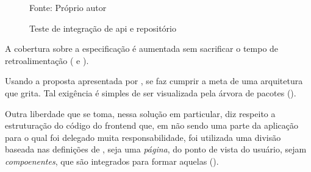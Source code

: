   \begin{figure}[h]
    \centering
    \caption{Teste de integração de api e repositório}
    \small{Fonte: Próprio autor}
    \label{fig:testes-de-integracao-api-e-repositorio}
  \end{figure}

  A cobertura sobre a especificação é aumentada sem sacrificar o tempo de retroalimentação ( e ).

  Usando a proposta apresentada por , se faz cumprir a meta de uma arquitetura que grita. Tal exigência é simples de ser visualizada pela árvora de pacotes ().

  Outra liberdade que se toma, nessa solução em particular, diz respeito a estruturação do código do frontend que, em não sendo uma parte da aplicação para o qual foi delegado muita responsabilidade, foi utilizada uma divisão baseada nas definições de , seja uma \emph{página}, do ponto de vista do usuário, sejam \emph{compoenentes}, que são integrados para formar aquelas ().

